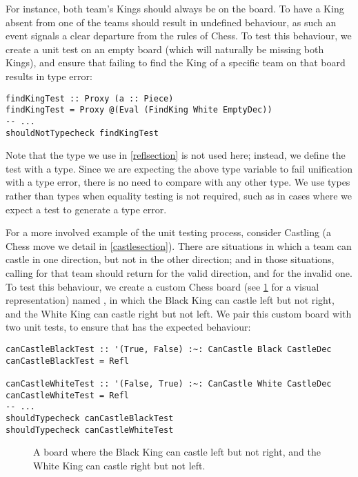 For instance, both team's Kings should always be on the board. To have a King absent from one of the teams should result in undefined behaviour, as such an event signals a clear departure from the rules of Chess. To test this behaviour, we create a unit test on an empty board (which will naturally be missing both Kings), and ensure that failing to find the King of a specific team on that board results in type error:

\begin{lstlisting}
findKingTest :: Proxy (a :: Piece)
findKingTest = Proxy @(Eval (FindKing White EmptyDec))
-- ...
shouldNotTypecheck findKingTest
\end{lstlisting}

Note that the \inline{(:~:)} type we use in \cref{reflsection} is not used here; instead, we define the test with a  type. Since we are expecting the above type variable  to fail unification with a type error, there is no need to compare  with any other type. We use  types rather than \inline{(:~:)} types when equality testing is not required, such as in cases where we expect a test to generate a type error.

For a more involved example of the unit testing process, consider Castling (a Chess move we detail in \cref{castlesection}). There are situations in which a team can castle in one direction, but not in the other direction; and in those situations, calling  for that team should return  for the valid direction, and  for the invalid one. To test this behaviour, we create a custom Chess board (see \cref{castleboard} for a visual representation) named , in which the Black King can castle left but not right, and the White King can castle right but not left. We pair this custom board with two unit tests, to ensure that  has the expected behaviour:

\begin{lstlisting}
canCastleBlackTest :: '(True, False) :~: CanCastle Black CastleDec
canCastleBlackTest = Refl

canCastleWhiteTest :: '(False, True) :~: CanCastle White CastleDec
canCastleWhiteTest = Refl
-- ...
shouldTypecheck canCastleBlackTest
shouldTypecheck canCastleWhiteTest
\end{lstlisting}

\begin{figure}
    \centering
    \showboard
    \caption{A board where the Black King can castle left but not right, and the White King can castle right but not left.}
    \label{castleboard}
\end{figure}


